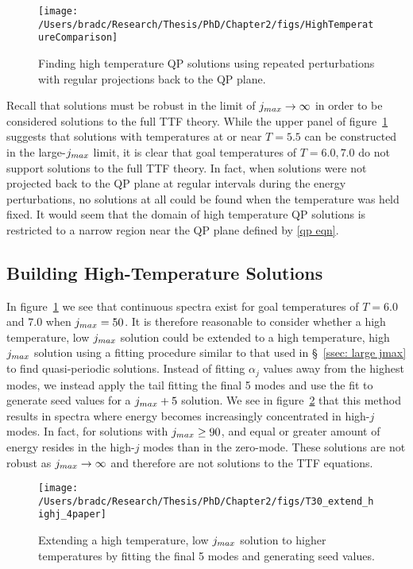 \documentclass[../PhD.tex]{subfiles}
\begin{document}
\begin{figure}[h]
	\centering
		\texttt{[image: /Users/bradc/Research/Thesis/PhD/Chapter2/figs/HighTemperatureComparison]}
		\caption{Finding high temperature QP solutions using repeated perturbations with regular projections back to the QP plane.}
		\label{fig: const T perturbs}
\end{figure}

Recall that solutions must be robust in the limit of $j_{max} \to \infty$ in order to be considered solutions to the full TTF theory. While the upper panel of figure~\ref{fig: const T perturbs} suggests that solutions with temperatures at or near $T=5.5$ can be constructed in the large-$j_{max}$ limit, it is clear that goal temperatures of $T=6.0, 7.0$ do not support solutions to the full TTF theory. In fact, when solutions were not projected back to the QP plane at regular intervals during the energy perturbations, no solutions at all could be found when the temperature was held fixed. It would seem that the domain of high temperature QP solutions is restricted to a narrow region near the QP plane defined by \eqref{qp eqn}. 


\subsection{Building High-Temperature Solutions}
\label{ssec: by hand highT}

In figure~\ref{fig: const T perturbs} we see that continuous spectra exist for goal temperatures of $T=6.0$ and $7.0$ when $j_{max} = 50$. It is therefore reasonable to consider whether a high temperature, low $j_{max}$ solution could be extended to a high temperature, high $j_{max}$ solution using a fitting procedure similar to that used in \S~\!\ref{ssec: large jmax} to find quasi-periodic solutions. Instead of fitting $\alpha_j$ values away from the highest modes, we instead apply the tail fitting the final 5 modes and use the fit to generate seed values for a $j_{max} + 5$ solution. We see in figure~\ref{fig: manual highT} that this method results in spectra where energy becomes increasingly concentrated in high-$j$ modes. In fact, for solutions with $j_{max} \geq 90$, and equal or greater amount of energy resides in the high-$j$ modes than in the zero-mode. These solutions are not robust as $j_{max} \to \infty$ and therefore are not solutions to the TTF equations.

\begin{figure}[h]
	\centering
	\texttt{[image: /Users/bradc/Research/Thesis/PhD/Chapter2/figs/T30\_extend\_highj\_4paper]}
	\caption[Constructing high temperature solutions by hand]{Extending a high temperature, low $j_{max}$ solution to higher temperatures by fitting the final 5 modes and generating seed values.}
	\label{fig: manual highT}
\end{figure}
\end{document}
